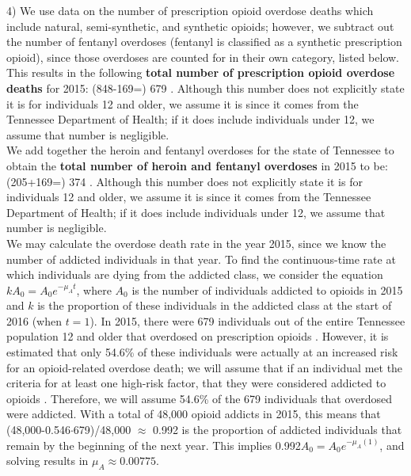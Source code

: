 \documentclass[12pt]{article}
\begin{document}
4) We use data on the number of prescription opioid overdose deaths which include natural, semi-synthetic, and synthetic opioids; however, we subtract out the number of fentanyl overdoses (fentanyl is classified as a synthetic prescription opioid), since those overdoses are counted for in their own category, listed below. This results in the following  \textbf{total number of prescription opioid overdose deaths} for 2015: (848-169=) 679 \cite{PDO}. Although this number does not explicitly state it is for individuals 12 and older, we assume it is since it comes from the Tennessee Department of Health; if it does include individuals under 12, we assume that number is negligible. \\

We add together the heroin and fentanyl overdoses for the state of Tennessee to obtain the \textbf{total number of heroin and fentanyl overdoses} in 2015 to be: (205+169=) 374 \cite{PDO}. Although this number does not explicitly state it is for individuals 12 and older, we assume it is since it comes from the Tennessee Department of Health; if it does include individuals under 12, we assume that number is negligible. \\

We may calculate the overdose death rate in the year 2015, since we know the number of addicted individuals in that year. To find the continuous-time rate at which individuals are dying from the addicted class, we consider the equation $k A_{0}=A_{0}e^{-\mu_{A}t}$, where $A_0$ is the number of individuals addicted to opioids in 2015 and $k$ is the proportion of these individuals in the addicted class at the start of 2016 (when $t=1$). In 2015, there were 679 individuals out of the entire Tennessee population 12 and older that overdosed on prescription opioids \cite{PDO}. However, it is estimated that only 54.6\% of these individuals were actually at an increased risk for an opioid-related overdose death; we will assume that if an individual met the criteria for at least one high-risk factor, that they were considered addicted to opioids \cite{Gwira}. Therefore, we will assume 54.6\% of the 679 individuals that overdosed were addicted. With a total of 48,000 opioid addicts in 2015, this means that (48,000-0.546$\cdot$679)/48,000 $\approx$ 0.992 is the proportion of addicted individuals that remain by the beginning of the next year. This implies 0.992$A_0=A_0 e^{-\mu_{A}(1)}$, and solving results in $\mu_{A} \approx 0.00775.$
\end{document}
